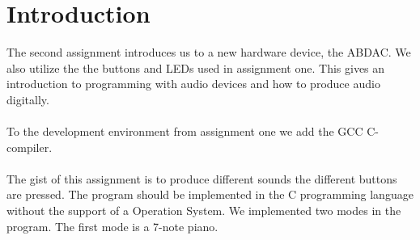 \section{Introduction}
The second assignment introduces us to a new hardware device, the ABDAC. We also utilize the
the buttons and LEDs used in assignment one. This gives an introduction to programming with
audio devices and how to produce audio digitally.\\
\\
To the development environment from assignment one we add the GCC C-compiler.\\
\\
The gist of this assignment is to produce different sounds the different buttons are pressed.
The program should be implemented in the C programming language without the support of a
Operation System. We implemented two modes in the program. The first mode is a 7-note piano.\\
\\
